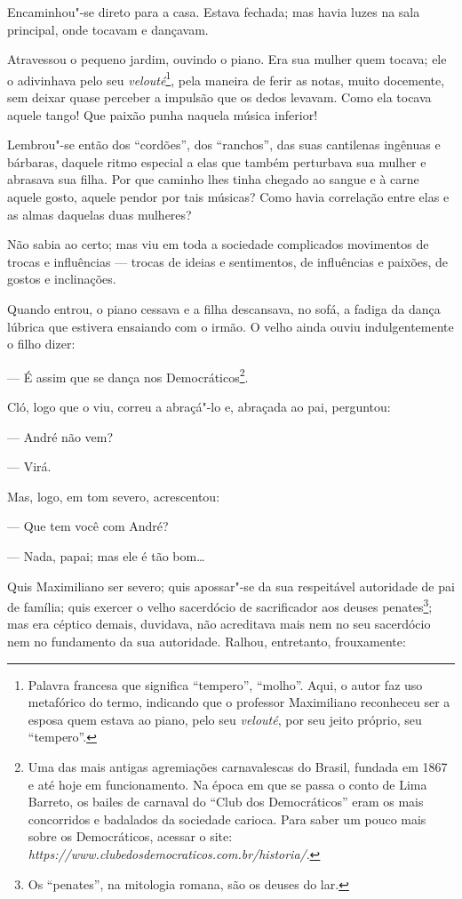 Encaminhou"-se direto para a casa. Estava fechada; mas havia luzes na
sala principal, onde tocavam e dançavam.

Atravessou o pequeno jardim, ouvindo o piano. Era sua mulher quem
tocava; ele o adivinhava pelo seu \emph{velouté}\footnote{Palavra
  francesa que significa ``tempero'', ``molho''. Aqui, o autor faz uso
  metafórico do termo, indicando que o professor Maximiliano reconheceu
  ser a esposa quem estava ao piano, pelo seu \emph{velouté}, por seu
  jeito próprio, seu ``tempero''.}, pela maneira de ferir as notas,
muito docemente, sem deixar quase perceber a impulsão que os dedos
levavam. Como ela tocava aquele tango! Que paixão punha naquela música
inferior!

Lembrou"-se então dos ``cordões'', dos ``ranchos'', das suas cantilenas
ingênuas e bárbaras, daquele ritmo especial a elas que também perturbava
sua mulher e abrasava sua filha. Por que caminho lhes tinha chegado ao
sangue e à carne aquele gosto, aquele pendor por tais músicas? Como
havia correlação entre elas e as almas daquelas duas mulheres?

Não sabia ao certo; mas viu em toda a sociedade complicados movimentos
de trocas e influências --- trocas de ideias e sentimentos, de
influências e paixões, de gostos e inclinações.

Quando entrou, o piano cessava e a filha descansava, no sofá, a fadiga
da dança lúbrica que estivera ensaiando com o irmão. O velho ainda ouviu
indulgentemente o filho dizer:

--- É assim que se dança nos Democráticos\footnote{Uma das mais antigas
  agremiações carnavalescas do Brasil, fundada em 1867 e até hoje em
  funcionamento. Na época em que se passa o conto de Lima Barreto, os
  bailes de carnaval do ``Club dos Democráticos'' eram os mais
  concorridos e badalados da sociedade carioca. Para saber um pouco mais
  sobre os Democráticos, acessar o site:
  \emph{https://www.clubedosdemocraticos.com.br/historia/}.}.

Cló, logo que o viu, correu a abraçá"-lo e, abraçada ao pai, perguntou:

--- André não vem?

--- Virá.

Mas, logo, em tom severo, acrescentou:

--- Que tem você com André?

--- Nada, papai; mas ele é tão bom\ldots{}

Quis Maximiliano ser severo; quis apossar"-se da sua respeitável
autoridade de pai de família; quis exercer o velho sacerdócio de
sacrificador aos deuses penates\footnote{Os ``penates'', na mitologia
  romana, são os deuses do lar.}; mas era céptico demais, duvidava, não
acreditava mais nem no seu sacerdócio nem no fundamento da sua
autoridade. Ralhou, entretanto, frouxamente:

